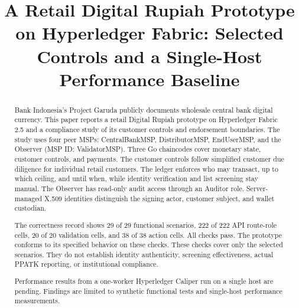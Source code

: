 \documentclass[conference]{IEEEtran}
\begin{document}
\title{A Retail Digital Rupiah Prototype on Hyperledger Fabric: Selected
Controls and a Single-Host Performance Baseline}

\author{
	\and
	\and
}

\maketitle

\begin{abstract}
Bank Indonesia's Project Garuda publicly documents wholesale central bank
digital currency. This paper reports a retail Digital Rupiah prototype on
Hyperledger Fabric 2.5 and a compliance study of its customer controls and
endorsement boundaries. The study uses four peer MSPs: CentralBankMSP,
DistributorMSP, EndUserMSP, and the Observer (MSP ID: ValidatorMSP). Three Go
chaincodes cover monetary state, customer controls, and payments. The customer
controls follow simplified customer due diligence for individual retail
customers. The ledger enforces who may transact, up to which ceiling, and until
when, while identity verification and list screening stay manual. The Observer
has read-only audit access through an Auditor role. Server-managed X.509
identities distinguish the signing actor, customer subject, and wallet custodian.

The correctness record shows 29 of 29 functional scenarios, 222 of 222 API
route-role cells, 20 of 20 validation cells, and 38 of 38 action cells. All checks pass. The prototype conforms to its specified behavior on
these checks. These checks cover only the selected scenarios. They do not establish
identity authenticity, screening effectiveness, actual PPATK reporting, or
institutional compliance.

Performance results from a one-worker Hyperledger Caliper run on a single host
are pending. Findings are limited to synthetic functional tests and single-host performance measurements.
\end{abstract}
\end{document}
